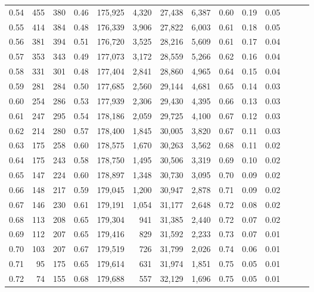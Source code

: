 \begin{tabular}{rrrrrrrrrrrrrr}
0.54 &    455 &  380 &  0.46 &  175,925 &    4,320 &  27,438 &   6,387 &  0.60 &  0.19 &      0.05 \\
0.55 &    414 &  384 &  0.48 &  176,339 &    3,906 &  27,822 &   6,003 &  0.61 &  0.18 &      0.05 \\
0.56 &    381 &  394 &  0.51 &  176,720 &    3,525 &  28,216 &   5,609 &  0.61 &  0.17 &      0.04 \\
0.57 &    353 &  343 &  0.49 &  177,073 &    3,172 &  28,559 &   5,266 &  0.62 &  0.16 &      0.04 \\
0.58 &    331 &  301 &  0.48 &  177,404 &    2,841 &  28,860 &   4,965 &  0.64 &  0.15 &      0.04 \\
0.59 &    281 &  284 &  0.50 &  177,685 &    2,560 &  29,144 &   4,681 &  0.65 &  0.14 &      0.03 \\
0.60 &    254 &  286 &  0.53 &  177,939 &    2,306 &  29,430 &   4,395 &  0.66 &  0.13 &      0.03 \\
0.61 &    247 &  295 &  0.54 &  178,186 &    2,059 &  29,725 &   4,100 &  0.67 &  0.12 &      0.03 \\
0.62 &    214 &  280 &  0.57 &  178,400 &    1,845 &  30,005 &   3,820 &  0.67 &  0.11 &      0.03 \\
0.63 &    175 &  258 &  0.60 &  178,575 &    1,670 &  30,263 &   3,562 &  0.68 &  0.11 &      0.02 \\
0.64 &    175 &  243 &  0.58 &  178,750 &    1,495 &  30,506 &   3,319 &  0.69 &  0.10 &      0.02 \\
0.65 &    147 &  224 &  0.60 &  178,897 &    1,348 &  30,730 &   3,095 &  0.70 &  0.09 &      0.02 \\
0.66 &    148 &  217 &  0.59 &  179,045 &    1,200 &  30,947 &   2,878 &  0.71 &  0.09 &      0.02 \\
0.67 &    146 &  230 &  0.61 &  179,191 &    1,054 &  31,177 &   2,648 &  0.72 &  0.08 &      0.02 \\
0.68 &    113 &  208 &  0.65 &  179,304 &      941 &  31,385 &   2,440 &  0.72 &  0.07 &      0.02 \\
0.69 &    112 &  207 &  0.65 &  179,416 &      829 &  31,592 &   2,233 &  0.73 &  0.07 &      0.01 \\
0.70 &    103 &  207 &  0.67 &  179,519 &      726 &  31,799 &   2,026 &  0.74 &  0.06 &      0.01 \\
0.71 &     95 &  175 &  0.65 &  179,614 &      631 &  31,974 &   1,851 &  0.75 &  0.05 &      0.01 \\
0.72 &     74 &  155 &  0.68 &  179,688 &      557 &  32,129 &   1,696 &  0.75 &  0.05 &      0.01 \\

\end{tabular}
